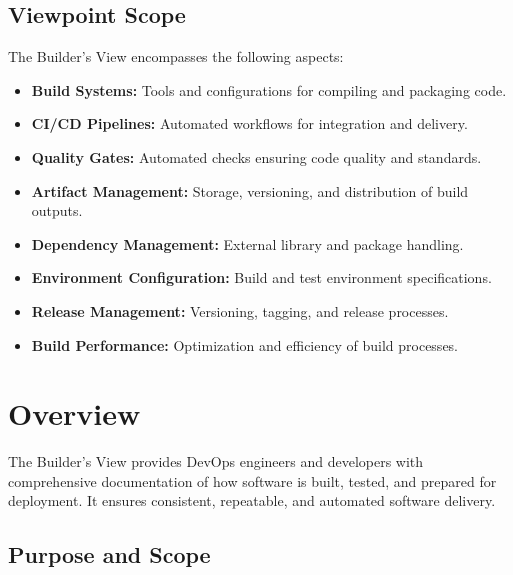 \documentclass[11pt,letterpaper]{article}
\begin{document}
\subsection{Viewpoint Scope}

The Builder's View encompasses the following aspects:

\begin{itemize}
    \item \textbf{Build Systems:} Tools and configurations for compiling and packaging code.
    
    \item \textbf{CI/CD Pipelines:} Automated workflows for integration and delivery.
    
    \item \textbf{Quality Gates:} Automated checks ensuring code quality and standards.
    
    \item \textbf{Artifact Management:} Storage, versioning, and distribution of build outputs.
    
    \item \textbf{Dependency Management:} External library and package handling.
    
    \item \textbf{Environment Configuration:} Build and test environment specifications.
    
    \item \textbf{Release Management:} Versioning, tagging, and release processes.
    
    \item \textbf{Build Performance:} Optimization and efficiency of build processes.
\end{itemize}

\section{Overview}

The Builder's View provides DevOps engineers and developers with comprehensive documentation of how software is built, tested, and prepared for deployment. It ensures consistent, repeatable, and automated software delivery.

\subsection{Purpose and Scope}
\end{document}
